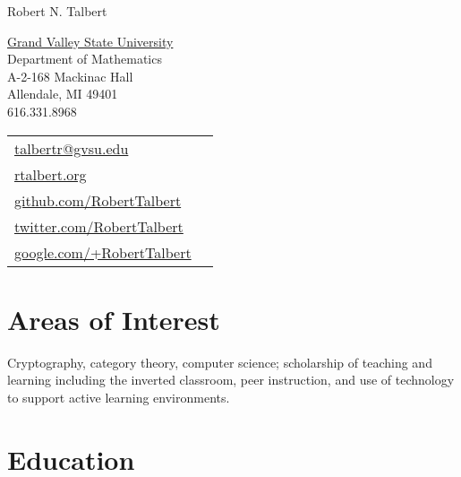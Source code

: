 \documentclass[letterpaper]{article}
\def\name{Robert N. Talbert}
\begin{document}
{\Large \name}


\vspace{0.25in}

\begin{minipage}{0.45\linewidth}
  \href{http://www.gvsu.edu/}{Grand Valley State University} \\
  Department of Mathematics \\
  A-2-168 Mackinac Hall \\
  Allendale, MI 49401 \\
  616.331.8968
\end{minipage}
\begin{minipage}{0.45\linewidth}
  \begin{tabular}{ll}
    \href{mailto:talbertr@gvsu.edu}{talbertr@gvsu.edu} \\
    \href{http://faculty.gvsu.edu/talbertr/}{rtalbert.org} \\
    \href{http://www.github.com}{github.com/RobertTalbert} \\
    \href{http://www.twitter.com/RobertTalbert}{twitter.com/RobertTalbert} \\
    \href{http://www.google.com/+RobertTalbert}{google.com/+RobertTalbert}
  \end{tabular}
\end{minipage}


\section*{Areas of Interest}

Cryptography, category theory, computer science; scholarship of teaching and learning including the inverted classroom, peer instruction, and use of technology to support active learning environments.

\section*{Education}
\end{document}
